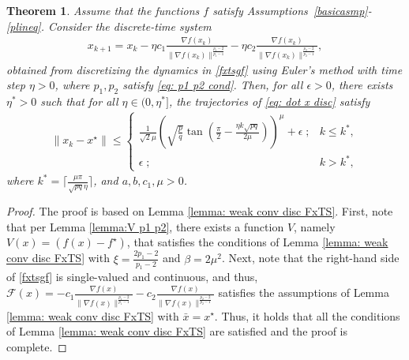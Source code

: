 \documentclass[letterpaper]{article}
\newtheorem{theorem}{Theorem}
\begin{document}
\begin{theorem}\label{thm: discretized}
Assume that the functions $f$ satisfy Assumptions~\ref{basicasmp}-\ref{plineq}. Consider the discrete-time system 
\begin{align}\label{eq: dot x disc}
    x_{k+1} = x_k -\eta c_1\frac{\nabla f(x_k)}{\|\nabla f(x_k)\|^{\frac{p_1-2}{p_1-1}}} -\eta c_2\frac{\nabla f(x_k)}{\|\nabla f(x_k)\|^{\frac{p_2-2}{p_2-1}}}, 
\end{align}
obtained from discretizing the dynamics in \eqref{fxtsgf} using Euler's method with time step $\eta>0$, where $p_1, p_2$ satisfy \eqref{eq: p1 p2 cond}. Then, for all $\epsilon>0$, there exists $\eta^*>0$ such that for all $\eta\in (0, \eta^*]$, the trajectories of \eqref{eq: dot x disc} satisfy {\small
\begin{align}\label{eq: disc bound}
    \|x_k-x^\star\|\leq \begin{cases}
   \frac{1}{\sqrt{2}\mu}\left(\!\sqrt{\frac{p}{q}}\tan\left(\frac{\pi}{2}\!-\!\frac{\eta k\sqrt{pq}}{2\mu}\!\right)\right)^{\mu}\!+\!\epsilon\; ; & k\leq k^*,\\
    \epsilon \; ; & k > k^*,
    \end{cases}
\end{align}}\normalsize
where $k^* = \lceil \frac{\mu\pi}{\sqrt{pq}\eta} \rceil$, and $a, b, c_1, \mu>0$.
\end{theorem}
\begin{proof}
The proof is based on Lemma \ref{lemma: weak conv disc FxTS}. First, note that per Lemma \ref{lemma:V p1 p2}, there exists a function $V$, namely $V(x) = (f(x)-f^\star)$, that satisfies the conditions of Lemma \ref{lemma: weak conv disc FxTS} with $\xi = \frac{2p_1-2}{p_1-2}$ and $\beta = 2\mu^2$. Next, note that the right-hand side of \eqref{fxtsgf} is single-valued and continuous, and thus, $\mathcal F(x) = -c_1\frac{\nabla f(x)}{\|\nabla f(x)\|^{\frac{p_1-2}{p_1-1}}} -c_2\frac{\nabla f(x)}{\|\nabla f(x)\|^{\frac{p_2-2}{p_2-1}}}$ satisfies the assumptions of Lemma \ref{lemma: weak conv disc FxTS}  with $\bar x = x^\star$. Thus, it holds that all the conditions of Lemma \ref{lemma: weak conv disc FxTS} are satisfied and the proof is complete. 
\end{proof}

\end{document}
